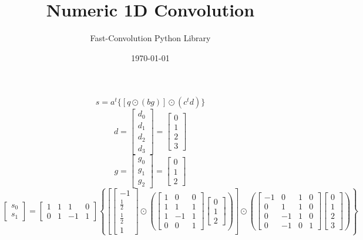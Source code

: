 \documentclass{article}%
\title{Numeric 1D Convolution}%
\author{Fast{-}Convolution Python Library}%
\date{\today}%
\begin{document}
%
\normalsize%
\maketitle%
\[%
s = a^t \{[q \odot (bg)] \odot (c^t d)\}%
\]%
\[%
d = \left[\begin{matrix}d_{0}\\d_{1}\\d_{2}\\d_{3}\end{matrix}\right] = \left[\begin{matrix}0\\1\\2\\3\end{matrix}\right]%
\]%
\[%
g = \left[\begin{matrix}g_{0}\\g_{1}\\g_{2}\end{matrix}\right] = \left[\begin{matrix}0\\1\\2\end{matrix}\right]%
\]%
\[%
\left[\begin{matrix}s_{0}\\s_{1}\end{matrix}\right] = \left[\begin{matrix}1 & 1 & 1 & 0\\0 & 1 & -1 & 1\end{matrix}\right] \left\{ \left[ \left[\begin{matrix}-1\\\frac{1}{2}\\\frac{1}{2}\\1\end{matrix}\right] \odot \left( \left[\begin{matrix}1 & 0 & 0\\1 & 1 & 1\\1 & -1 & 1\\0 & 0 & 1\end{matrix}\right] \left[\begin{matrix}0\\1\\2\end{matrix}\right] \right) \right] \odot \left( \left[\begin{matrix}-1 & 0 & 1 & 0\\0 & 1 & 1 & 0\\0 & -1 & 1 & 0\\0 & -1 & 0 & 1\end{matrix}\right] \left[\begin{matrix}0\\1\\2\\3\end{matrix}\right] \right) \right\}%
\]%
\end{document}
